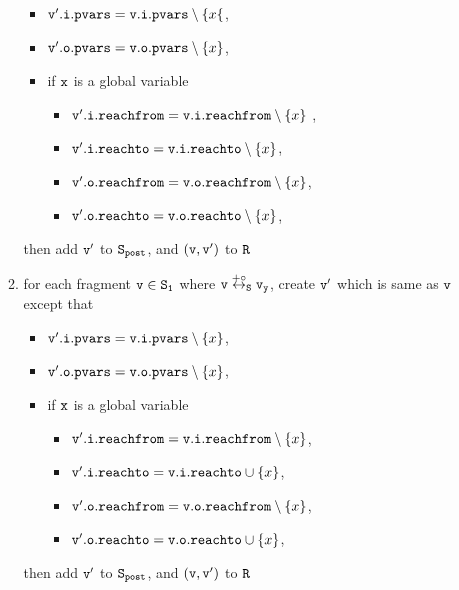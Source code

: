 \begin{itemize}
\begin{enumerate}
\begin{itemize}
\item $\mathtt{v}'.\mathtt{i}.\mathtt{pvars} = \mathtt{v}.\mathtt{i}.\mathtt{pvars} \setminus \{x\{$,
\item $\mathtt{v}'.\mathtt{o}.\mathtt{pvars} = \mathtt{v}.\mathtt{o}.\mathtt{pvars} \setminus \left\{x\right\}$,
\item if $\tt x$ is a global variable
\begin{itemize}
\item $\mathtt{v}'.\mathtt{i}.\mathtt{reachfrom} = \mathtt{v}.\mathtt{i}.\mathtt{reachfrom} \setminus \left\{x\right\}$ ,
\item $\mathtt{v}'.\mathtt{i}.\mathtt{reachto} = \mathtt{v}.\mathtt{i}.\mathtt{reachto} \setminus \left\{x\right\}$,
\item $\mathtt{v}'.\mathtt{o}.\mathtt{reachfrom} = \mathtt{v}.\mathtt{o}.\mathtt{reachfrom} \setminus \left\{x\right\}$,
\item $\mathtt{v}'.\mathtt{o}.\mathtt{reachto} = \mathtt{v}.\mathtt{o}.\mathtt{reachto} \setminus \left\{x\right\}$,
\end{itemize}
\end{itemize}
then add $\tt v'$ to $\tt S_{post}$, and $\tt (v,v')$ to $\tt R$
\item for each fragment $\tt v \in S_1$ where $\tt v \overset{+\circ}\leftrightarrow_S v_y$, create $\tt v'$ which is same as $\tt v$ except that 
\begin{itemize}
\item $\mathtt{v}'.\mathtt{i}.\mathtt{pvars} = \mathtt{v}.\mathtt{i}.\mathtt{pvars} \setminus \left\{x\right\}$,
\item $\mathtt{v}'.\mathtt{o}.\mathtt{pvars} = \mathtt{v}.\mathtt{o}.\mathtt{pvars} \setminus \left\{x\right\}$,
\item if $\tt x$ is a global variable
\begin{itemize}
\item $\mathtt{v}'.\mathtt{i}.\mathtt{reachfrom} = \mathtt{v}.\mathtt{i}.\mathtt{reachfrom} \setminus \left\{x\right\}$,
\item $\mathtt{v}'.\mathtt{i}.\mathtt{reachto} = \mathtt{v}.\mathtt{i}.\mathtt{reachto} \cup \left\{x\right\}$,
 \item $\mathtt{v}'.\mathtt{o}.\mathtt{reachfrom} = \mathtt{v}.\mathtt{o}.\mathtt{reachfrom} \setminus \left\{x\right\}$,
 \item $\mathtt{v}'.\mathtt{o}.\mathtt{reachto} = \mathtt{v}.\mathtt{o}.\mathtt{reachto} \cup \left\{x\right\}$,
\end{itemize}
\end{itemize}
then add $\tt v'$ to $\tt S_{post}$, and $\tt (v,v')$ to $\tt R$


\end{enumerate}
\end{itemize}
